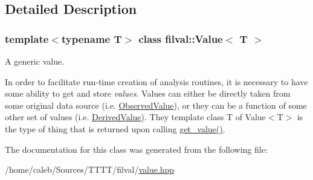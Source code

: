 \subsection{Detailed Description}
\subsubsection*{template$<$typename T$>$\newline
class filval\+::\+Value$<$ T $>$}

A generic value. 

In order to facilitate run-\/time creation of analysis routines, it is necessary to have some ability to get and store {\itshape values}. Values can either be directly taken from some original data source (i.\+e. \hyperlink{classfilval_1_1ObservedValue}{Observed\+Value}), or they can be a function of some other set of values (i.\+e. \hyperlink{classfilval_1_1DerivedValue}{Derived\+Value}). They template class T of Value$<$\+T$>$ is the type of thing that is returned upon calling \hyperlink{classfilval_1_1Value_a690d54d59d428984cc0f8e82ecf5ba9d}{get\+\_\+value()}. 

The documentation for this class was generated from the following file\+:\begin{DoxyCompactItemize}
\item 
/home/caleb/\+Sources/\+T\+T\+T\+T/filval/\hyperlink{value_8hpp}{value.\+hpp}\end{DoxyCompactItemize}
